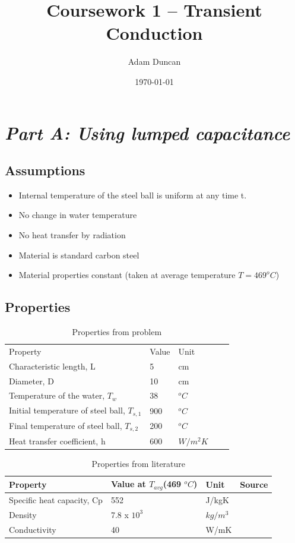 \documentclass[11pt]{article}
\title{Coursework 1 – Transient Conduction}
\author{Adam Duncan}
\date{\today}
\begin{document}
\maketitle

\section{\emph{Part A: Using lumped capacitance}}
\subsection{Assumptions}
\begin{itemize}
	\item Internal temperature of the steel ball is uniform at any time t.
	\item No change in water temperature
	\item No heat transfer by radiation
	\item Material is standard carbon steel
	\item Material properties constant (taken at average temperature $T = 469 ^{o}C$)
\end{itemize}
\subsection{Properties}
\begin{table}[h]
	\centering
	\caption{Properties from problem}
	\begin{tabular}{lllll}
		Property & Value & Unit &  &  \\ \cline{1-3}
		Characteristic   length, L & 5 & cm &  &  \\
		Diameter, D & 10 & cm &  &  \\
		Temperature   of the water, $T_w$ & 38 & $^oC$ &  &  \\
		Initial   temperature of steel ball, $T_{s,1}$ & 900 & $^oC$ &  &  \\
		Final   temperature of steel ball, $T_{s,2}$ & 200 & $^oC$ &  &  \\
		Heat transfer   coefficient, h & 600 & $W/m^{2}K$ &  & 
	\end{tabular}
	\label{tab1}
\end{table}

\begin{table}[h]
	\centering
	\caption{Properties from literature}
	\begin{tabular}{llll}
		Property & Value at $T_{avg}$(469 $^{o}C$) & Unit & Source \\ \hline
		Specific heat   capacity, Cp & 552 & J/kgK &  \\
		Density & 7.8 x $10^3$ & $kg/m^3$ &  \\
		Conductivity & 40 & W/mK & 
	\end{tabular}
	\label{tab2}
\end{table}
\FloatBarrier
\end{document}

